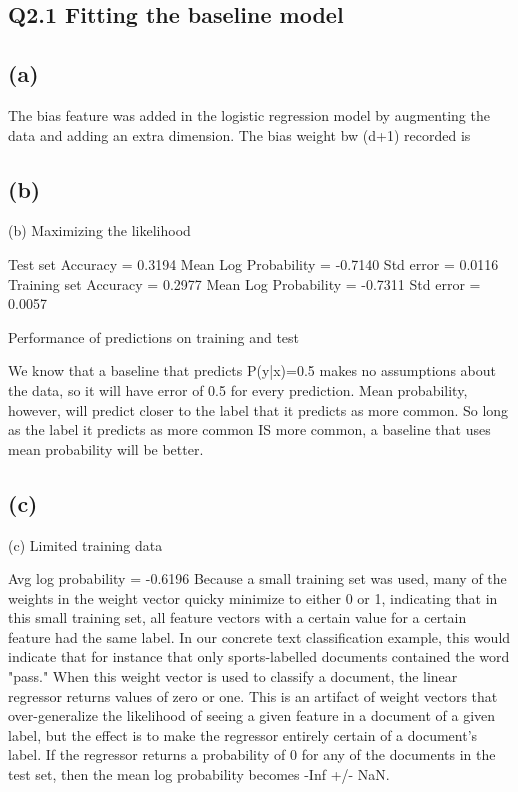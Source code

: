 \documentclass[english]{article}
\begin{document}
\subsection*{Q2.1 Fitting the baseline model}


\subsection*{(a)}

The bias feature was added in the logistic regression model by augmenting the data and adding
an extra dimension. The bias weight bw (d+1) recorded is 


\subsection*{(b)}
(b) Maximizing the likelihood

Test set
Accuracy = 0.3194
Mean Log Probability = -0.7140
Std error = 0.0116
\\
Training set
Accuracy = 0.2977
Mean Log Probability = -0.7311
Std error  = 0.0057


Performance of predictions on training and test

We know that a baseline that predicts P(y|x)=0.5 makes no assumptions
about the data, so it will have error of 0.5 for every prediction.  Mean
probability, however, will predict closer to the label that it predicts
as more common.  So long as the label it predicts as more common IS more
common, a baseline that uses mean probability will be better.


\subsection*{(c)}
(c) Limited training data

Avg log probability = -0.6196
Because a small training set was used, many of the weights in the weight
vector quicky minimize to either 0 or 1, indicating that in this small 
training set, all feature vectors with a certain value for a certain
feature had the same label.  In our concrete text classification example,
this would indicate that for instance that only sports-labelled documents 
contained the word "pass."
When this weight vector is used to classify a document, the linear
regressor returns values of zero or one.  This is an artifact of weight
vectors that over-generalize the likelihood of seeing a given feature in a
document of a given label, but the effect is to make the regressor entirely
certain of a document's label.  If the regressor returns a probability of 0
for any of the documents in the test set, then the mean log probability
becomes -Inf +/- NaN.
\end{document}
